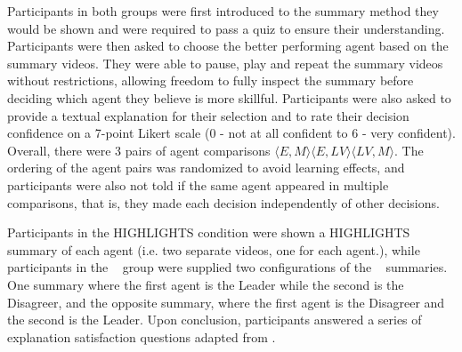 Participants in both groups were first introduced to the summary method they
would be shown and were required to pass a quiz to ensure their understanding.
Participants were then asked to choose the better performing agent based on the
summary videos. They were able to pause, play and repeat the summary videos
without restrictions, allowing freedom to fully inspect the
summary before deciding which agent they believe is more skillful. Participants
were also asked to provide a textual explanation for their selection and to rate
their decision confidence on a 7-point Likert scale (0 - not at all confident to 6 - very confident). Overall, there were 3 pairs of
agent comparisons $\langle E,M\rangle \langle E,LV\rangle \langle LV,M \rangle
$. The ordering of the agent pairs was randomized to avoid learning effects, and
participants were also not told if the same agent appeared in multiple
comparisons, that is, they made each decision independently of other decisions.

Participants in the HIGHLIGHTS condition were shown a HIGHLIGHTS summary of each
agent (i.e. two separate videos, one for each agent.), while participants in the
\disalg~ group were supplied two configurations of the \disalg~ summaries. One
summary where the first agent is the Leader while the second is the Disagreer,
and the opposite summary, where the first agent is the Disagreer and the second
is the Leader. 
Upon
conclusion, participants answered a series of explanation
satisfaction questions adapted from \cite{hoffman2018metrics}. 

